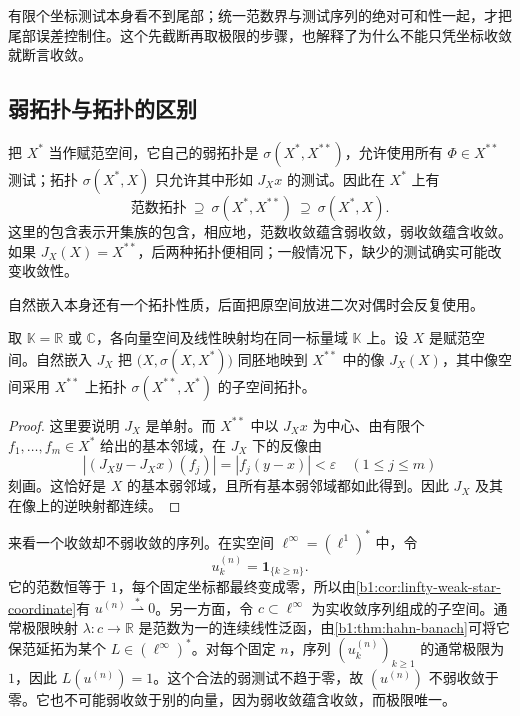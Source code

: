 有限个坐标测试本身看不到尾部；统一范数界与测试序列的绝对可和性一起，才把尾部误差控制住。这个先截断再取极限的步骤，也解释了为什么不能只凭坐标收敛就断言\WeakStar{}收敛。

\subsection{弱拓扑与\WeakStar{}拓扑的区别}
\label{b1:subsec:090203}

把 \(X^*\) 当作赋范空间，它自己的弱拓扑是 \(\sigma(X^*,X^{**})\)，允许使用所有 \(\Phi\in X^{**}\) 测试；\WeakStar{}拓扑 \(\sigma(X^*,X)\) 只允许其中形如 \(J_Xx\) 的测试。因此在 \(X^*\) 上有
\[
 \text{范数拓扑}\ \supseteq\ \sigma(X^*,X^{**})
 \ \supseteq\ \sigma(X^*,X).
\]
这里的包含表示开集族的包含，相应地，范数收敛蕴含弱收敛，弱收敛蕴含\WeakStar{}收敛。如果 \(J_X(X)=X^{**}\)，后两种拓扑便相同；一般情况下，缺少的测试确实可能改变收敛性。

\ProseParagraphBreak

自然嵌入本身还有一个拓扑性质，后面把原空间放进二次对偶时会反复使用。

\begin{proposition}\label{b1:prop:canonical-weak-embedding}
取 \(\mathbb K=\mathbb R\) 或 \(\mathbb C\)，各向量空间及线性映射均在同一标量域 \(\mathbb K\) 上。设 \(X\) 是赋范空间。自然嵌入 \(J_X\) 把 \(\bigl(X,\sigma(X,X^*)\bigr)\) 同胚地映到 \(X^{**}\) 中的像 \(J_X(X)\)，其中像空间采用 \(X^{**}\) 上\WeakStar{}拓扑 \(\sigma(X^{**},X^*)\) 的子空间拓扑。
\end{proposition}
\begin{proof}
这里要说明 \(J_X\) 是单射。而 \(X^{**}\) 中以 \(J_Xx\) 为中心、由有限个 \(f_1,\ldots,f_m\in X^*\) 给出的\WeakStar{}基本邻域，在 \(J_X\) 下的反像由
\[
 |(J_Xy-J_Xx)(f_j)|=|f_j(y-x)|<\varepsilon
 \quad(1\leq j\leq m)
\]
刻画。这恰好是 \(X\) 的基本弱邻域，且所有基本弱邻域都如此得到。因此 \(J_X\) 及其在像上的逆映射都连续。
\end{proof}

来看一个\WeakStar{}收敛却不弱收敛的序列。在实空间 \(\ell^\infty=(\ell^1)^*\) 中，令
\[
 u_k^{(n)}=\mathbf1_{\{k\geq n\}}.
\]
它的范数恒等于 \(1\)，每个固定坐标都最终变成零，所以由\cref{b1:cor:linfty-weak-star-coordinate}有 \(u^{(n)}\overset{*}{\rightharpoonup}0\)。另一方面，令 \(c\subset\ell^\infty\) 为实收敛序列组成的子空间。通常极限映射 \(\lambda:c\to\mathbb R\) 是范数为一的连续线性泛函，由\cref{b1:thm:hahn-banach}可将它保范延拓为某个 \(L\in(\ell^\infty)^*\)。对每个固定 \(n\)，序列 \((u_k^{(n)})_{k\geq1}\) 的通常极限为 \(1\)，因此 \(L(u^{(n)})=1\)。这个合法的弱测试不趋于零，故 \((u^{(n)})\) 不弱收敛于零。它也不可能弱收敛于别的向量，因为弱收敛蕴含\WeakStar{}收敛，而\WeakStar{}极限唯一。


